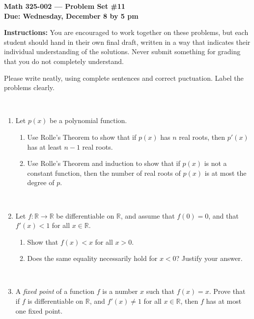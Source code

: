\documentclass{amsart}
\def\R{\mathbb R}
\begin{document}
\begin{center}
{\large\bfseries
Math 325-002 --- Problem Set \#11\\
Due: Wednesday, December 8 by 5 pm}
\end{center}





{\bf Instructions:} You are encouraged to work together on these
problems, but each student should hand in their own final draft,
written in a way that indicates their individual understanding of
the solutions. Never submit something for grading
that you do not completely understand. 

Please write neatly, using complete sentences and correct
puctuation. Label the problems clearly. 


\



\begin{enumerate}




\item Let $p(x)$ be a polynomial function.
\begin{enumerate}
\item Use Rolle's Theorem to show that if $p(x)$ has $n$ real roots, then $p'(x)$ has at least $n-1$ real roots.
\item Use Rolle's Theorem and induction to show that if $p(x)$ is not a constant function, then the number of real roots of $p(x)$ is at most the degree of $p$.
\end{enumerate}

\

\item Let $f:\R \to \R$ be differentiable on $\R$, and assume that $f(0)=0$, and that $f'(x)<1$ for all $x\in \R$.
\begin{enumerate}
\item Show that $f(x)<x$ for all $x > 0$.
\item Does the same equality necessarily hold for $x<0$? Justify your answer.
\end{enumerate}

\

\item A \emph{fixed point} of a function $f$ is a number $x$ such that $f(x)=x$. Prove that if $f$ is differentiable on $\R$, and $f'(x)\neq 1$ for all $x\in \R$, then $f$ has at most one fixed point.
\thispagestyle{empty}
\end{enumerate}
\end{document}
